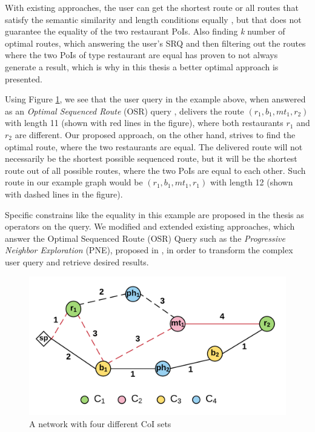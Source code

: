 With existing approaches, the user can get the shortest route \cite{OSR} or all routes that satisfy the semantic similarity and length conditions equally \cite{semanticSRQ}, but that does not guarantee the equality of the two restaurant PoIs. Also finding \textit{k} number of optimal routes, which answering the user's SRQ and then filtering out the routes where the two PoIs of type restaurant are equal has proven to not always generate a result, which is why in this thesis a better optimal approach is presented.

\enlargethispage*{30pt}

Using Figure \ref{fig:example}, we see that the user query in the example above, when answered as an \textit{Optimal Sequenced Route} (OSR) query \cite{OSR}, delivers the route $(r_1, b_1, mt_1, r_2)$ with length 11 (shown with red lines in the figure), where both restaurants $r_1$ and $r_2$ are different. Our proposed approach, on the other hand, strives to find the optimal route, where the two restaurants are equal. The delivered route will not necessarily be the shortest possible sequenced route, but it will be the shortest route out of all possible routes, where the two PoIs are equal to each other. Such route in our example graph would be $(r_1, b_1, mt_1, r_1)$ with length 12 (shown with dashed lines in the figure).

Specific constrains like the equality in this example are proposed in the thesis as operators on the query. We modified and extended existing approaches, which answer the Optimal Sequenced Route (OSR) Query such as the \textit{Progressive Neighbor Exploration} (PNE), proposed in \cite{OSR}, in order to transform the complex user query and retrieve desired results.

\begin{figure}[H]
	\includegraphics[scale=1]{images/Example_V2.png}
	\centering
	\caption{A network with four different CoI sets}
	\label{fig:example}
\end{figure}

